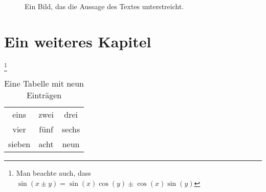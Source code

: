 
\blinddocument
{}

\begin{figure}[h]
  \centering
  \caption{Ein Bild, das die Aussage des Textes unterstreicht.}
  \label{statement}
\end{figure}







\chapter{Ein weiteres Kapitel}


\label{introduction}

\Blindtext\footnote{Man beachte auch, dass $\sin(x\pm y) = \sin(x)\cos(y) \pm \cos(x)\sin(y)$}

\begin{table}[h]
  \centering
  \begin{tabular}{ccc}
  \toprule
  eins & zwei & drei\\
  vier & fünf & sechs\\
  sieben & acht & neun\\
  \bottomrule
  \end{tabular}
  \caption{Eine Tabelle mit neun Einträgen}
  \label{tabelle3}
\end{table}
